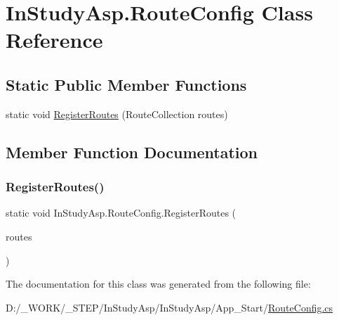 \hypertarget{class_in_study_asp_1_1_route_config}{}\section{In\+Study\+Asp.\+Route\+Config Class Reference}
\label{class_in_study_asp_1_1_route_config}
\subsection*{Static Public Member Functions}
\begin{DoxyCompactItemize}
\item 
static void \hyperlink{class_in_study_asp_1_1_route_config_a3fc41a6de193b638a62c47244aa87b7e}{Register\+Routes} (Route\+Collection routes)
\end{DoxyCompactItemize}


\subsection{Member Function Documentation}
\mbox{\label{class_in_study_asp_1_1_route_config_a3fc41a6de193b638a62c47244aa87b7e}} 
\subsubsection{\texorpdfstring{Register\+Routes()}{RegisterRoutes()}}
{\footnotesize\ttfamily static void In\+Study\+Asp.\+Route\+Config.\+Register\+Routes (\begin{DoxyParamCaption}\item[{Route\+Collection}]{routes }\end{DoxyParamCaption})\hspace{0.3cm}{\ttfamily [static]}}



The documentation for this class was generated from the following file\+:\begin{DoxyCompactItemize}
\item 
D\+:/\+\_\+\+W\+O\+R\+K/\+\_\+\+S\+T\+E\+P/\+In\+Study\+Asp/\+In\+Study\+Asp/\+App\+\_\+\+Start/\hyperlink{_route_config_8cs}{Route\+Config.\+cs}\end{DoxyCompactItemize}
